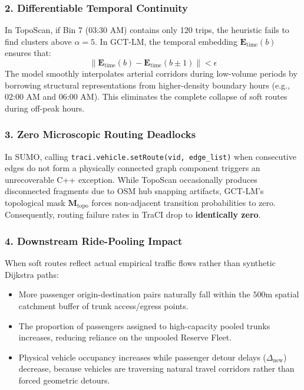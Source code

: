 \documentclass[12pt,a4paper]{article}
\begin{document}
\subsubsection{2. Differentiable Temporal Continuity}
In TopoScan, if Bin 7 (03:30 AM) contains only 120 trips, the heuristic fails to find clusters above $\alpha=5$. In GCT-LM, the temporal embedding $\mathbf{E}_{\text{time}}(b)$ ensures that:
\begin{equation}
\|\mathbf{E}_{\text{time}}(b) - \mathbf{E}_{\text{time}}(b \pm 1)\| < \epsilon
\end{equation}
The model smoothly interpolates arterial corridors during low-volume periods by borrowing structural representations from higher-density boundary hours (e.g., 02:00 AM and 06:00 AM). This eliminates the complete collapse of soft routes during off-peak hours.

\subsubsection{3. Zero Microscopic Routing Deadlocks}
In SUMO, calling \texttt{traci.vehicle.setRoute(vid, edge\_list)} when consecutive edges do not form a physically connected graph component triggers an unrecoverable C++ exception. While TopoScan occasionally produces disconnected fragments due to OSM hub snapping artifacts, GCT-LM's topological mask $\mathbf{M}_{\text{topo}}$ forces non-adjacent transition probabilities to zero. Consequently, routing failure rates in TraCI drop to \textbf{identically zero}.

\subsubsection{4. Downstream Ride-Pooling Impact}
When soft routes reflect actual empirical traffic flows rather than synthetic Dijkstra paths:
\begin{itemize}
    \item More passenger origin-destination pairs naturally fall within the $500\text{m}$ spatial catchment buffer of trunk access/egress points.
    \item The proportion of passengers assigned to high-capacity pooled trunks increases, reducing reliance on the unpooled Reserve Fleet.
    \item Physical vehicle occupancy increases while passenger detour delays ($\Delta_{\text{new}}$) decrease, because vehicles are traversing natural travel corridors rather than forced geometric detours.
\end{itemize}
\end{document}
